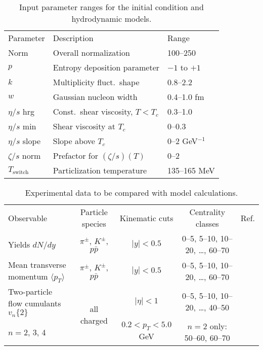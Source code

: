 \documentclass[aps,prc,reprint,amsmath,nofootinbib]{revtex4-1}
\newcommand{\avg}[1]{\langle #1 \rangle}
\newcommand{\vnk}[2]{v_#1\{#2\}}
\newcommand{\paddedhline}{\noalign{\smallskip}\hline\noalign{\smallskip}}
\begin{document}
\begin{table}
  \caption{
    \label{tab:design}
    Input parameter ranges for the initial condition and hydrodynamic models.
  }
  \begin{ruledtabular}
  \begin{tabular}{lll}
    Parameter         & Description                        & Range           \\
    \paddedhline
    Norm              & Overall normalization              & 100--250        \\
    $p$               & Entropy deposition parameter       & $-1$ to $+1$    \\
    $k$               & Multiplicity fluct.\ shape         & 0.8--2.2        \\
    $w$               & Gaussian nucleon width             & 0.4--1.0 fm     \\
    $\eta/s$ hrg      & Const.\ shear viscosity, $T < T_c$ & 0.3--1.0        \\
    $\eta/s$ min      & Shear viscosity at $T_c$           & 0--0.3          \\
    $\eta/s$ slope    & Slope above $T_c$                  & 0--2 GeV$^{-1}$ \\
    $\zeta/s$ norm    & Prefactor for $(\zeta/s)(T)$       & 0--2            \\
    $T_\text{switch}$ & Particlization temperature         & 135--165 MeV    \\
  \end{tabular}
  \end{ruledtabular}
\end{table}

\begin{table*}
  \caption{
    \label{tab:observables}
    Experimental data to be compared with model calculations.
  }
  \begin{ruledtabular}
  \begin{tabular}{lcccc}
    Observable & Particle species & Kinematic cuts & Centrality classes & Ref. \\
    \paddedhline
    Yields $dN/dy$                       & $\pi^\pm$, $K^\pm$, $p\bar p$ &
    $|y| < 0.5$ & 0--5, 5--10, 10--20, \ldots, 60--70 & \cite{Abelev:2013vea} \\
    \noalign{\smallskip}
    Mean transverse momentum $\avg{p_T}$ & $\pi^\pm$, $K^\pm$, $p\bar p$ &
    $|y| < 0.5$ & 0--5, 5--10, 10--20, \ldots, 60--70 & \cite{Abelev:2013vea} \\
    \noalign{\smallskip}
    Two-particle flow cumulants $\vnk n 2$ & \multirow{2}{*}{all charged} &
    $|\eta| < 1$ & 0--5, 5--10, 10--20, \ldots, 40--50 &
    \multirow{2}{*}{\cite{ALICE:2011ab}} \\
    $n = 2$, 3, 4 & & $0.2 < p_T < 5.0$ GeV & $n = 2$ only: 50--60, 60--70 & \\
  \end{tabular}
  \end{ruledtabular}
\end{table*}
\end{document}
